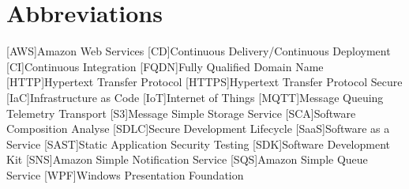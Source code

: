 \chapter*{Abbreviations}

\begin{acronym}
    [AWS]{Amazon Web Services}
    [CD]{Continuous Delivery/Continuous Deployment}
    [CI]{Continuous Integration}
    [FQDN]{Fully Qualified Domain Name}
    [HTTP]{Hypertext Transfer Protocol}
    [HTTPS]{Hypertext Transfer Protocol Secure}    
    [IaC]{Infrastructure as Code}
    [IoT]{Internet of Things}
    [MQTT]{Message Queuing Telemetry Transport}
    [S3]{Message Simple Storage Service}
    [SCA]{Software Composition Analyse}
    [SDLC]{Secure Development Lifecycle}
    [SaaS]{Software as a Service}
    [SAST]{Static Application Security Testing}  
    [SDK]{Software Development Kit}
    [SNS]{Amazon Simple Notification Service}
    [SQS]{Amazon Simple Queue Service}
    [WPF]{Windows Presentation Foundation}    
\end{acronym}
